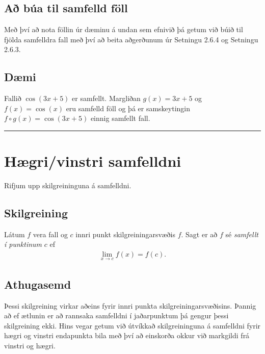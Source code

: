 \documentclass[b5paper,11pt,icelandic]{sphinxmanual}
\begin{document}
\subsection{Að búa til samfelld föll}
\label{kafli02:a-bua-til-samfelld-foll}
Með því að nota föllin úr dæminu á undan sem efnivið þá getum við búið
til fjölda samfelldra fall með því að beita aðgerðunum úr Setningu 2.6.4
og Setningu 2.6.3.


\subsection{Dæmi}
\label{kafli02:id14}\label{kafli02:index-10}
Fallið \(\cos(3x+5)\) er samfellt. Margliðan \(g(x) =3x+5\) og
\(f(x) = \cos(x)\) eru samfelld föll og þá er samskeytingin
\(f\circ g(x) = \cos(3x+5)\) einnig samfellt fall.


\bigskip\hrule{}\bigskip



\section{Hægri/vinstri samfelldni}
\label{kafli02:haegri-vinstri-samfelldni}
Rifjum upp skilgreininguna á samfelldni.


\subsection{Skilgreining}
\label{kafli02:skilgreining}
Látum \(f\) vera fall og \(c\) innri punkt skilgreiningarsvæðis
\(f\). Sagt er að \(f\) sé \emph{samfellt í punktinum} \(c\) ef
\begin{equation*}
\begin{split}\lim_{x\rightarrow c}f(x)=f(c).\end{split}
\end{equation*}

\subsection{Athugasemd}
\label{kafli02:athugasemd}
Þessi skilgreining virkar aðeins fyrir innri punkta
skilgreiningarsvæðisins. Þannig að ef ætlunin er að rannsaka samfelldni
í jaðarpunktum þá gengur þessi skilgreining ekki. Hins vegar getum við
útvíkkað skilgreininguna á samfelldni fyrir hægri og vinstri endapunkta
bila með því að einskorða okkur við markgildi frá vinstri og hægri.
\end{document}
